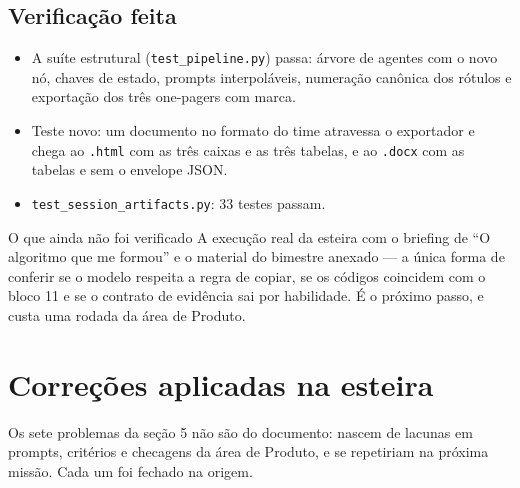\documentclass[11pt,a4paper]{article}
\newcommand{\arq}[1]{\texttt{\small #1}}
\begin{document}
\subsection{Verificação feita}

\begin{itemize}
\item A suíte estrutural (\arq{test\_pipeline.py}) passa: árvore de agentes com o novo nó, chaves de estado, prompts interpoláveis, numeração canônica dos rótulos e exportação dos três one-pagers com marca.
\item Teste novo: um documento no formato do time atravessa o exportador e chega ao \arq{.html} com as três caixas e as três tabelas, e ao \arq{.docx} com as tabelas e sem o envelope JSON.
\item \arq{test\_session\_artifacts.py}: 33 testes passam.
\end{itemize}

\begin{notabox}{O que ainda não foi verificado}
A execução real da esteira com o briefing de ``O algoritmo que me formou'' e o material do bimestre anexado --- a única forma de conferir se o modelo respeita a regra de copiar, se os códigos coincidem com o bloco 11 e se o contrato de evidência sai por habilidade. É o próximo passo, e custa uma rodada da área de Produto.
\end{notabox}

\section{Correções aplicadas na esteira}

Os sete problemas da seção 5 não são do documento: nascem de lacunas em prompts, critérios e checagens da área de Produto, e se repetiriam na próxima missão. Cada um foi fechado na origem.
\end{document}
